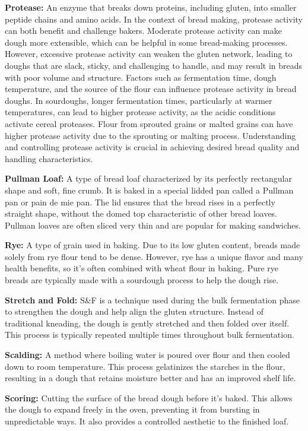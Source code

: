 \textbf{Protease:} An enzyme that breaks down proteins, including gluten, into smaller
peptide chains and amino acids. In the context of bread making, protease activity can
both benefit and challenge bakers. Moderate protease activity can make dough more
extensible, which can be helpful in some bread-making processes. However, excessive
protease activity can weaken the gluten network, leading to doughs that are slack,
sticky, and challenging to handle, and may result in breads with poor volume and
structure. Factors such as fermentation time, dough temperature, and the source of the
flour can influence protease activity in bread doughs. In sourdoughs, longer
fermentation times, particularly at warmer temperatures, can lead to higher protease
activity, as the acidic conditions activate cereal proteases. Flour from sprouted
grains or malted grains can have higher protease activity due to the sprouting or
malting process. Understanding and controlling protease activity is crucial in
achieving desired bread quality and handling characteristics.

\textbf{Pullman Loaf:} A type of bread loaf characterized by its perfectly rectangular
shape and soft, fine crumb. It is baked in a special lidded pan called a Pullman pan
or pain de mie pan. The lid ensures that the bread rises in a perfectly straight
shape, without the domed top characteristic of other bread loaves. Pullman loaves are
often sliced very thin and are popular for making sandwiches.

\textbf{Rye:} A type of grain used in baking. Due to its low gluten content, breads
made solely from rye flour tend to be dense. However, rye has a unique flavor and
many health benefits, so it's often combined with wheat flour in baking. Pure rye
breads are typically made with a sourdough process to help the dough rise.

\textbf{Stretch and Fold:} S\&F is a technique used during the bulk fermentation phase
to strengthen the dough and help align the gluten structure. Instead of traditional
kneading, the dough is gently stretched and then folded over itself. This process is
typically repeated multiple times throughout bulk fermentation.

\textbf{Scalding:} A method where boiling water is poured over flour and then cooled
down to room temperature. This process gelatinizes the starches in the flour,
resulting in a dough that retains moisture better and has an improved shelf life.

\textbf{Scoring:} Cutting the surface of the bread dough before it's baked. This
allows the dough to expand freely in the oven, preventing it from bursting in
unpredictable ways. It also provides a controlled aesthetic to the finished loaf.

